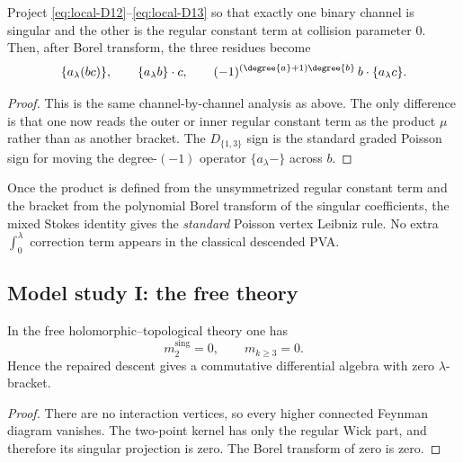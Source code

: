 \begin{proposition}
\label{prop:mixed-projection}
Project \eqref{eq:local-D12}--\eqref{eq:local-D13} so that exactly one binary channel is
singular and the other is the regular constant term at collision parameter $0$.  Then,
after Borel transform, the three residues become
\[
\{a_\lambda(bc)\},
\qquad
\{a_\lambda b\}\cdot c,
\qquad
(-1)^{(\degree{a}+1)\degree{b}}\,b\cdot\{a_\lambda c\}.
\]
\end{proposition}

\begin{proof}
This is the same channel-by-channel analysis as above.  The only difference is that
one now reads the outer or inner regular constant term as the product $\mu$ rather than
as another bracket.  The $D_{\{1,3\}}$ sign is the standard graded Poisson sign for
moving the degree-$(-1)$ operator $\{a_\lambda-\}$ across $b$.
\end{proof}

\begin{remark}
Once the product is defined from the unsymmetrized regular constant term and the bracket
from the polynomial Borel transform of the singular coefficients, the mixed Stokes
identity gives the \emph{standard} Poisson vertex Leibniz rule.  No extra
$\int_0^\lambda$ correction term appears in the classical descended PVA.
\end{remark}

\subsection{Model study I: the free theory}

\begin{proposition}
\label{prop:free-study}
In the free holomorphic--topological theory one has
\[
m_2^{\mathrm{sing}}=0,\qquad m_{k\ge3}=0.
\]
Hence the repaired descent gives a commutative differential algebra with zero
$\lambda$-bracket.
\end{proposition}

\begin{proof}
There are no interaction vertices, so every higher connected Feynman diagram vanishes.
The two-point kernel has only the regular Wick part, and therefore its singular
projection is zero.  The Borel transform of zero is zero.
\end{proof}

